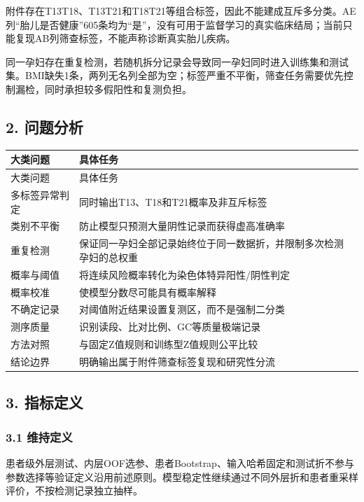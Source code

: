 \documentclass[UTF8,12pt,a4paper]{ctexart}
\begin{document}
附件存在T13T18、T13T21和T18T21等组合标签，因此不能建成互斥多分类。AE列“胎儿是否健康”605条均为“是”，没有可用于监督学习的真实临床结局；当前只能复现AB列筛查标签，不能声称诊断真实胎儿疾病。

同一孕妇存在重复检测，若随机拆分记录会导致同一孕妇同时进入训练集和测试集。BMI缺失1条，两列无名列全部为空；标签严重不平衡，筛查任务需要优先控制漏检，同时承担较多假阳性和复测负担。

\subsection{2. 问题分析}
\begingroup
\footnotesize
\setlength{\tabcolsep}{1.5pt}
\begin{longtable}{|>{\raggedright\arraybackslash}p{}|>{\raggedright\arraybackslash}p{}|}
\hline
大类问题 & 具体任务 \\ \hline
\endfirsthead
\hline
大类问题 & 具体任务 \\ \hline
\endhead
多标签异常判定 & 同时输出T13、T18和T21概率及非互斥标签 \\ \hline
类别不平衡 & 防止模型只预测大量阴性记录而获得虚高准确率 \\ \hline
重复检测 & 保证同一孕妇全部记录始终位于同一数据折，并限制多次检测孕妇的总权重 \\ \hline
概率与阈值 & 将连续风险概率转化为染色体特异阳性/阴性判定 \\ \hline
概率校准 & 使模型分数尽可能具有概率解释 \\ \hline
不确定记录 & 对阈值附近结果设置复测区，而不是强制二分类 \\ \hline
测序质量 & 识别读段、比对比例、GC等质量极端记录 \\ \hline
方法对照 & 与固定Z值规则和训练型Z值规则公平比较 \\ \hline
结论边界 & 明确输出属于附件筛查标签复现和研究性分流 \\ \hline
\end{longtable}
\endgroup

\subsection{3. 指标定义}
\subsubsection{3.1 维持定义}
患者级外层测试、内层OOF选参、患者Bootstrap、输入哈希固定和测试折不参与参数选择等验证定义沿用前述原则。模型稳定性继续通过不同外层折和患者重采样评价，不按检测记录独立抽样。
\end{document}
